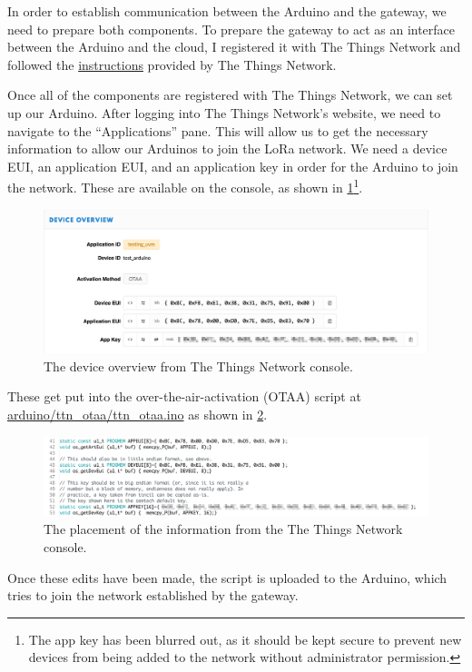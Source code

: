 In order to establish communication between the Arduino and the gateway, we need to prepare both components.
To prepare the gateway to act as an interface between the Arduino and the cloud, I registered it with The Things Network and followed the \href{https://www.thethingsnetwork.org/docs/gateways/multitech/aep.html}{instructions} provided by The Things Network.

Once all of the components are registered with The Things Network, we can set up our Arduino.
After logging into The Things Network's website, we need to navigate to the ``Applications'' pane.
This will allow us to get the necessary information to allow our Arduinos to join the LoRa network.
We need a device EUI, an application EUI, and an application key in order for the Arduino to join the network.
These are available on the console, as shown in \cref{fig:console}\footnote{The app key has been blurred out, as it should be kept secure to prevent new devices from being added to the network without administrator permission.}.
\begin{figure}[ht]
  \centering
  \includegraphics[width=\textwidth]{figure/console}
  \caption{The device overview from The Things Network console.}
  \label{fig:console}
\end{figure}

These get put into the over-the-air-activation (OTAA) script at \url{arduino/ttn_otaa/ttn_otaa.ino} as shown in \cref{fig:script}.
\begin{figure}[ht]
  \centering
  \includegraphics[width=\textwidth]{figure/script}
  \caption{The placement of the information from the The Things Network console.}
  \label{fig:script}
\end{figure}
Once these edits have been made, the script is uploaded to the Arduino, which tries to join the network established by the gateway.

